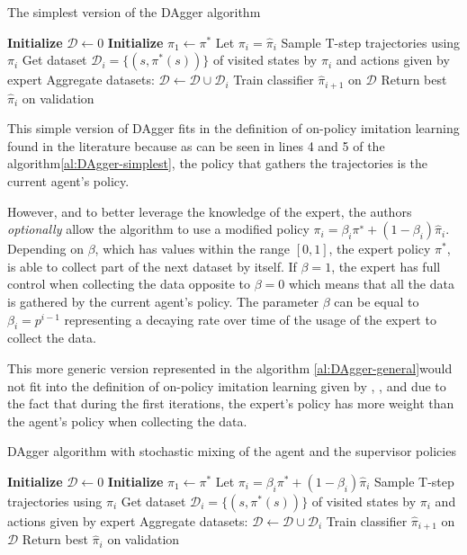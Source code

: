 \begin{algorithm}[H]
\caption{The simplest version of the DAgger algorithm }
\begin{algorithmic}[1]
\State \textbf{Initialize} $\mathcal{D} \leftarrow 0$ 
\State \textbf{Initialize} $\hat{\pi}_1 \leftarrow \pi^*$ 
\State Let $\pi_i = \hat{\pi}_i$
\State Sample T-step trajectories using $\pi_i$
\State Get dataset  $\mathcal{D}_i = \{(s, \pi^*(s))\}$ of visited states by $\pi_i$ and actions given by expert
\State Aggregate datasets:  $\mathcal{D} \leftarrow \mathcal{D} \cup  \mathcal{D}_i$
\State  Train classifier $\hat{\pi}_{i+1}$ on $\mathcal{D}$
\EndFor
\State Return best $\hat{\pi}_i$ on validation
\end{algorithmic}
\label{al:DAgger-simplest}
\end{algorithm}

This simple version of DAgger fits in the definition of on-policy imitation learning found in the literature because as can be seen in lines 4 and 5 of the algorithm\ref{al:DAgger-simplest}, the policy that gathers the trajectories is the current agent's policy.


However, and to better leverage the knowledge of the expert, the authors \textit{optionally} allow the algorithm to use a modified policy $\pi_i=\beta_i\pi^{∗}+ (1−\beta_i)\hat{\pi}_i$. Depending on $\beta$,  which has values within the range $[0,1]$, the expert policy $\pi^*$, is able to collect part of the next dataset by itself. If $\beta = 1$, the expert has full control when collecting the data opposite to $\beta=0$  which means that all the data is gathered by the current agent's policy. The parameter $\beta$ can be equal to $\beta_i=p^{i−1}$ representing a decaying rate over time of the usage of the expert to collect the data.


This more generic version represented in the algorithm \ref{al:DAgger-general}would not fit into the definition of on-policy imitation learning given by \cite{Osa:2018}, \cite{DBLP:journals/corr/LaskeyLHLMFG17}, \cite{OtherLaskeydefinitions:2019} and \cite{Anotherdefinitionfromberkeley:2020} due to the fact that during the first iterations, the expert's policy has more weight than the agent's policy when collecting the data.


\begin{algorithm}[H]
\caption{DAgger algorithm with stochastic mixing of the agent and the supervisor policies }
\begin{algorithmic}[1]
\State \textbf{Initialize} $\mathcal{D} \leftarrow 0$ 
\State \textbf{Initialize} $\hat{\pi}_1 \leftarrow \pi^*$ 
\State Let $\pi_i = \beta_i\pi^* + (1 -\beta_i)\hat{\pi}_i$
\State Sample T-step trajectories using $\pi_i$
\State Get dataset  $\mathcal{D}_i = \{(s, \pi^*(s))\}$ of visited states by $\pi_i$ and actions given by expert
\State Aggregate datasets:  $\mathcal{D} \leftarrow \mathcal{D} \cup  \mathcal{D}_i$
\State  Train classifier $\hat{\pi}_{i+1}$ on $\mathcal{D}$
\EndFor
\State Return best $\hat{\pi}_i$ on validation
\end{algorithmic}
\label{al:DAgger-general}
\end{algorithm}

